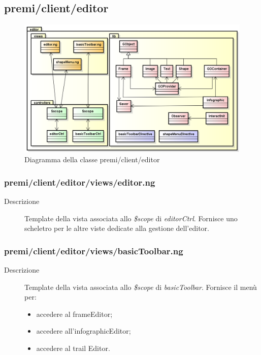 \clearpage
\subsection{premi/client/editor}
\begin{figure}[H]
\begin{center}
\includegraphics[scale=0.50]{img/diapkg/editor.png}
\caption{Diagramma della classe premi/client/editor}
\end{center}
\end{figure}

\subsubsection{premi/client/editor/views/editor.ng}

\begin{description}
\item[Descrizione] \hfill
	Template della vista associata allo \textit{\$scope} di \textit{editorCtrl}. Fornisce uno scheletro per le altre viste dedicate alla gestione dell'editor. 
\end{description}

\subsubsection{premi/client/editor/views/basicToolbar.ng}

\begin{description}
\item[Descrizione] \hfill
	Template della vista associata allo \textit{\$scope} di \textit{basicToolbar}. Fornisce il menù per:
	\begin{itemize}
	\item accedere al frameEditor;
	\item accedere all'infographicEditor;
	\item accedere al trail Editor.
	\end{itemize}
\end{description}

